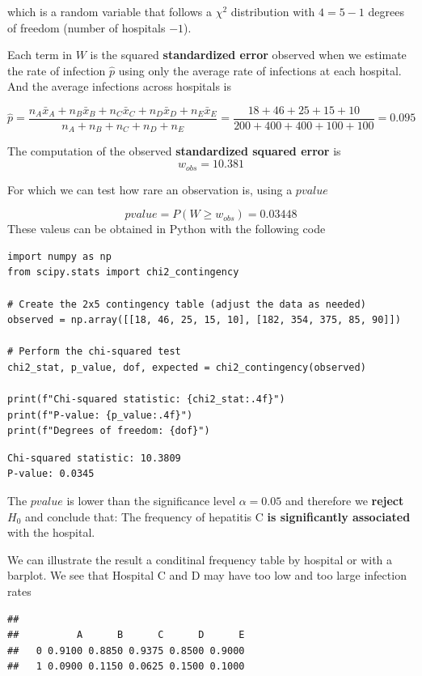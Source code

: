 \documentclass[
]{book}
\begin{document}
which is a random variable that follows a \(\chi^2\) distribution with \(4=5-1\) degrees of freedom (number of hospitals \(-1\)).

Each term in \(W\) is the squared \textbf{standardized error} observed when we estimate the rate of infection \(\hat{p}\) using only the average rate of infections at each hospital. And the average infections across hospitals is

\[\hat{p}=\frac{n_A\bar{x}_A+n_B\bar{x}_B+n_C\bar{x}_C+n_D\bar{x}_D+n_E\bar{x}_E}{n_A+n_B+n_C+n_D+n_E}=\frac{18+46+25+15+10}{200+400+400+100+100}=0.095\]

The computation of the observed \textbf{standardized squared error} is
\[w_{obs}=10.381\]

For which we can test how rare an observation is, using a \(pvalue\)

\[pvalue=P(W \geq w_{obs}) = 0.03448\]
These valeus can be obtained in Python with the following code

\begin{verbatim}
import numpy as np
from scipy.stats import chi2_contingency

# Create the 2x5 contingency table (adjust the data as needed)
observed = np.array([[18, 46, 25, 15, 10], [182, 354, 375, 85, 90]])

# Perform the chi-squared test
chi2_stat, p_value, dof, expected = chi2_contingency(observed)

print(f"Chi-squared statistic: {chi2_stat:.4f}")
print(f"P-value: {p_value:.4f}")
print(f"Degrees of freedom: {dof}")
\end{verbatim}

\begin{verbatim}
Chi-squared statistic: 10.3809
P-value: 0.0345
\end{verbatim}

The \(pvalue\) is lower than the significance level \(\alpha=0.05\) and therefore we \textbf{reject} \(H_0\) and conclude that: The frequency of hepatitis C \textbf{is significantly associated} with the hospital.

We can illustrate the result a conditinal frequency table by hospital or with a barplot. We see that Hospital C and D may have too low and too large infection rates

\begin{verbatim}
##    
##          A      B      C      D      E
##   0 0.9100 0.8850 0.9375 0.8500 0.9000
##   1 0.0900 0.1150 0.0625 0.1500 0.1000
\end{verbatim}
\end{document}
